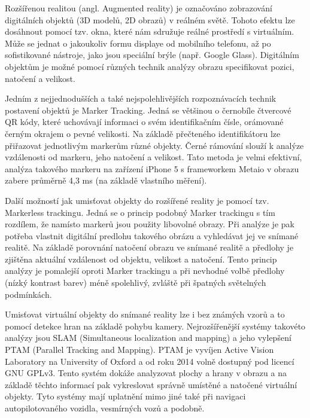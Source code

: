 \documentclass[twoside,12pt]{article}
\begin{document}
%
%

Rozšířenou realitou (angl. Augmented reality) je označováno zobrazování digitálních objektů (3D modelů, 2D obrazů) v reálném světě. Tohoto efektu lze dosáhnout pomocí tzv. okna, které nám sdružuje reálné prostředí s virtuálním. Může se jednat o jakoukoliv formu displaye od mobilního telefonu, až po sofistikované nástroje, jako jsou speciální brýle (např. Google Glass). Digitálním objektům je možné pomocí různých technik analýzy obrazu specifikovat pozici, natočení a velikost. 

Jedním z nejjednodušších a také nejspolehlivějších rozpoznávacích technik postavení objektů je Marker Tracking. Jedná se většinou o černobíle čtvercové QR kódy, které uchovávají informaci o svém identifikačním čísle, orámované černým okrajem o pevné velikosti. Na základě přečteného identifikátoru lze přiřazovat jednotlivým markerům různé objekty. Černé rámování slouží k analýze vzdálenosti od markeru, jeho natočení a velikost. Tato metoda je velmi efektivní, analýza takového markeru na zařízení iPhone 5 s frameworkem Metaio v obrazu zabere průměrně 4,3 ms (na základě vlastního měření).

Další možností jak umisťovat objekty do rozšířené reality je pomocí tzv. Markerless trackingu. Jedná se o princip podobný Marker trackingu s tím rozdílem, že namísto markerů jsou použity libovolné obrazy. Při analýze je pak potřeba vlastnit digitální predlohu takového obrázu a vyhledávat jej ve snímané realitě. Na základě porovnání natočení obrazu ve snímané realitě a předlohy je zjištěna aktuální vzdálenost od objektu, velikost a natočení. Tento princip analýzy je pomalejší oproti Marker trackingu a při nevhodné volbě předlohy (nízký kontrast barev) méně spolehlivý, zvláště při špatných světelných podmínkách.

Umisťovat virtuální objekty do snímané reality lze i bez známých vzorů a to pomocí detekce hran na základě pohybu kamery. Nejrozšířenější systémy takovéto analýzy jsou SLAM (Simultaneous localization and mapping) a jeho vylepšení PTAM (Parallel Tracking and Mapping). PTAM je vyvíjen Active Vision Laboratory na University of Oxford a od roku 2014 volně dostupný pod licencí GNU GPLv3. Tento systém dokáže analyzovat plochy a hrany v obrazu a na základě těchto informací pak vykreslovat správně umístěné a natočené virtuální objekty. Tyto systémy mají uplatnění mimo jiné také při navigaci autopilotovaného vozidla, vesmírných vozů a podobně.
\end{document}
